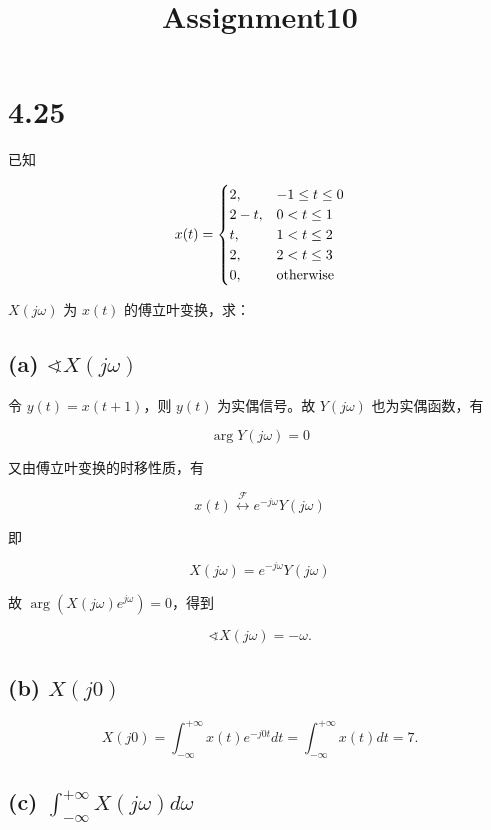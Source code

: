 \documentclass[11pt]{article}
\title{Assignment10}
\begin{document}
    
    \maketitle
    
    

    
    \section{4.25}\label{section}

已知

\[
x(t) = \begin{cases}
2, & -1 \le t \le 0 \\
2 - t, & 0 < t \le 1 \\
t, & 1 < t \le 2 \\
2, & 2 < t \le 3 \\
0, & \rm otherwise
\end{cases}
\]

\(X(j\omega)\) 为 \(x(t)\) 的傅立叶变换，求：

\subsection{\texorpdfstring{(a)
\(\sphericalangle X(j\omega)\)}{(a) \textbackslash sphericalangle X(j\textbackslash omega)}}\label{a-sphericalangle-xjomega}

令 \(y(t) = x(t + 1)\)，则 \(y(t)\) 为实偶信号。故 \(Y(j\omega)\)
也为实偶函数，有

\[
\arg Y(j\omega) = 0
\]

又由傅立叶变换的时移性质，有

\[
x(t) \stackrel{\mathcal{F}}{\longleftrightarrow} e^{-j\omega}Y(j\omega)
\]

即

\[
X(j\omega) = e^{-j\omega}Y(j\omega)
\]

故 \(\arg (X(j\omega)e^{j\omega})=0\)，得到

\[\boxed{
\sphericalangle X(j\omega) = -\omega.}
\]

\subsection{\texorpdfstring{(b) \(X(j0)\)}{(b) X(j0)}}\label{b-xj0}

\[\boxed{
X(j0) = \int_{-\infty}^{+\infty}x(t)e^{-j0t}dt = \int_{-\infty}^{+\infty}x(t)dt = 7.}
\]

\subsection{\texorpdfstring{(c)
\(\int_{-\infty}^{+\infty}X(j\omega)d\omega\)}{(c) \textbackslash int\_\{-\textbackslash infty\}\^{}\{+\textbackslash infty\}X(j\textbackslash omega)d\textbackslash omega}}\label{c-int_-inftyinftyxjomegadomega}
\end{document}
